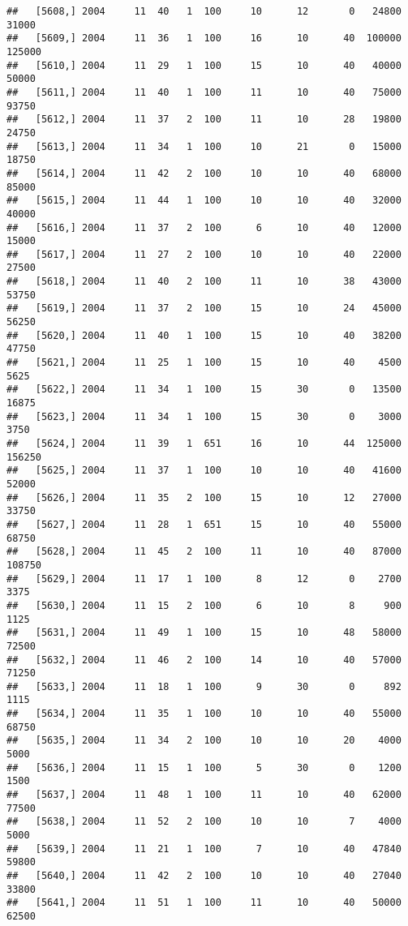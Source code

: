 \documentclass{article}\usepackage[]{graphicx}\usepackage[]{color}
\makeatletter
\newenvironment{kframe}{%
 \def\at@end@of@kframe{}%
 \ifinner\ifhmode%
  \def\at@end@of@kframe{\end{minipage}}%
  \begin{minipage}{\columnwidth}%
 \fi\fi%
 \def\FrameCommand##1{\hskip\@totalleftmargin \hskip-\fboxsep
 \colorbox{shadecolor}{##1}\hskip-\fboxsep
     \hskip-\linewidth \hskip-\@totalleftmargin \hskip\columnwidth}%
 \MakeFramed {\advance\hsize-\width
   \@totalleftmargin\z@ \linewidth\hsize
   \@setminipage}}%
 {\par\unskip\endMakeFramed%
 \at@end@of@kframe}
\newenvironment{knitrout}{}{} %
\makeatother
\begin{document}
\begin{knitrout}
\begin{kframe}
\begin{verbatim}
##   [5608,] 2004     11  40   1  100     10      12       0   24800   31000
##   [5609,] 2004     11  36   1  100     16      10      40  100000  125000
##   [5610,] 2004     11  29   1  100     15      10      40   40000   50000
##   [5611,] 2004     11  40   1  100     11      10      40   75000   93750
##   [5612,] 2004     11  37   2  100     11      10      28   19800   24750
##   [5613,] 2004     11  34   1  100     10      21       0   15000   18750
##   [5614,] 2004     11  42   2  100     10      10      40   68000   85000
##   [5615,] 2004     11  44   1  100     10      10      40   32000   40000
##   [5616,] 2004     11  37   2  100      6      10      40   12000   15000
##   [5617,] 2004     11  27   2  100     10      10      40   22000   27500
##   [5618,] 2004     11  40   2  100     11      10      38   43000   53750
##   [5619,] 2004     11  37   2  100     15      10      24   45000   56250
##   [5620,] 2004     11  40   1  100     15      10      40   38200   47750
##   [5621,] 2004     11  25   1  100     15      10      40    4500    5625
##   [5622,] 2004     11  34   1  100     15      30       0   13500   16875
##   [5623,] 2004     11  34   1  100     15      30       0    3000    3750
##   [5624,] 2004     11  39   1  651     16      10      44  125000  156250
##   [5625,] 2004     11  37   1  100     10      10      40   41600   52000
##   [5626,] 2004     11  35   2  100     15      10      12   27000   33750
##   [5627,] 2004     11  28   1  651     15      10      40   55000   68750
##   [5628,] 2004     11  45   2  100     11      10      40   87000  108750
##   [5629,] 2004     11  17   1  100      8      12       0    2700    3375
##   [5630,] 2004     11  15   2  100      6      10       8     900    1125
##   [5631,] 2004     11  49   1  100     15      10      48   58000   72500
##   [5632,] 2004     11  46   2  100     14      10      40   57000   71250
##   [5633,] 2004     11  18   1  100      9      30       0     892    1115
##   [5634,] 2004     11  35   1  100     10      10      40   55000   68750
##   [5635,] 2004     11  34   2  100     10      10      20    4000    5000
##   [5636,] 2004     11  15   1  100      5      30       0    1200    1500
##   [5637,] 2004     11  48   1  100     11      10      40   62000   77500
##   [5638,] 2004     11  52   2  100     10      10       7    4000    5000
##   [5639,] 2004     11  21   1  100      7      10      40   47840   59800
##   [5640,] 2004     11  42   2  100     10      10      40   27040   33800
##   [5641,] 2004     11  51   1  100     11      10      40   50000   62500

\end{verbatim}
\end{kframe}
\end{knitrout}
\end{document}
